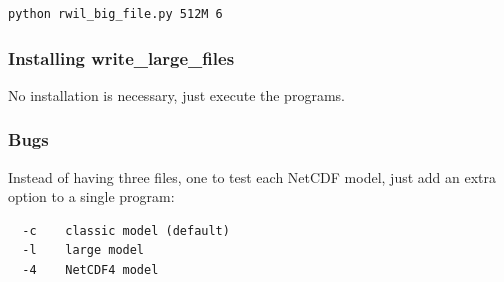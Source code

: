 \documentclass{manual}
\begin{document}
\begin{verbatim}
python rwil_big_file.py 512M 6
\end{verbatim}

\subsubsection{Installing write_large_files}
\label{subsubsec:write_large_files_install}

No installation is necessary, just execute the programs.

\subsubsection{Bugs}
\label{subsubsec:write_large_files_bugs}

Instead of having three files, one to test each NetCDF model, just add an extra option to 
a single program:
\begin{verbatim}
  -c    classic model (default)
  -l    large model
  -4    NetCDF4 model
\end{verbatim}

\end{document}
